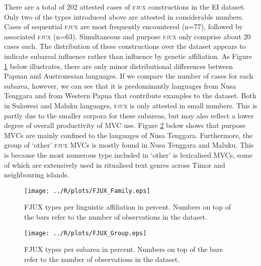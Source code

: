 There are a total of 202 attested cases of \textsc{fjux} constructions in the EI dataset. Only two of the types introduced above are attested in considerable numbers. Cases of sequential \textsc{fjux} are most frequently encountered (n=77), followed by associated \textsc{fjux} (n=63). Simultaneous and purpose \textsc{fjux} only comprise about 20 cases each. The distribution of these constructions over the dataset appears to indicate subareal influence rather than influence by genetic affiliation. As Figure \ref{fig:fjux-family} below illustrates, there are only minor distributional differences between Papuan and Austronesian languages. If we compare the number of cases for each subarea, however, we can see that it is predominantly languages from Nusa Tenggara and from Western Papua that contribute examples to the dataset. Both in Sulawesi and Maluku languages, \textsc{fjux} is only attested in small numbers. This is partly due to the smaller corpora for these subareas, but may also reflect a lower degree of overall productivity of MVC use. Figure \ref{fig:fjux-group} below shows that purpose MVCs are mainly confined to the languages of Nusa Tenggara. Furthermore, the group of `other' \textsc{fjux} MVCs is mostly found in Nusa Tenggara and Maluku. This is because the most numerous type included in `other' is lexicalised MVCs, some of which are extensively used in ritualised text genres across Timor and neighbouring islands.

\begin{figure}
\texttt{[image: ../R/plots/FJUX\_Family.eps]}
\caption[FJUX types per linguistic affiliation in percent]{FJUX types per linguistic affiliation in percent. Numbers on top of the bars refer to the number of observations in the dataset.}\label{fig:fjux-family}
\end{figure}
\begin{figure}
\texttt{[image: ../R/plots/FJUX\_Group.eps]}
\caption[FJUX types per subarea in percent]{FJUX types per subarea in percent. Numbers on top of the bars refer to the number of observations in the dataset.}\label{fig:fjux-group}
\end{figure}


